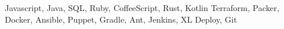 {Javascript, Java, SQL, Ruby, CoffeeScript, Rust, Kotlin}
{Terraform, Packer, Docker, Ansible, Puppet, Gradle, Ant, Jenkins, XL Deploy, Git}
